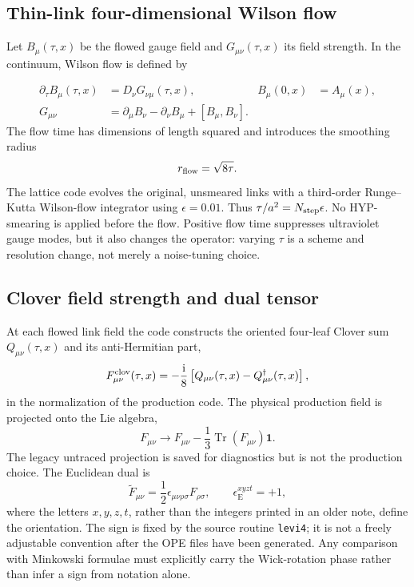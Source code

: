 \documentclass[11pt]{article}
\numberwithin{equation}{section}
\newcommand{\ii}{\mathrm{i}}
\DeclareMathOperator{\Tr}{Tr}
\begin{document}
\subsection{Thin-link four-dimensional Wilson flow}

Let \(B_\mu(\tau,x)\) be the flowed gauge field and
\(G_{\mu\nu}(\tau,x)\) its field strength.  In the continuum, Wilson flow is
defined by

\begin{align}
  \partial_\tau B_\mu(\tau,x)
  &=D_\nu G_{\nu\mu}(\tau,x),
  &B_\mu(0,x)&=A_\mu(x),
  \label{eq:gluon-wilson-flow-continuum}\\
  G_{\mu\nu}
  &=\partial_\mu B_\nu-\partial_\nu B_\mu+[B_\mu,B_\nu].
\end{align}
The flow time has dimensions of length squared and introduces the smoothing
radius
\begin{equation}
  r_{\rm flow}=\sqrt{8\tau}.
  \label{eq:gluon-flow-radius}
\end{equation}
The lattice code evolves the original, unsmeared links with a third-order
Runge--Kutta Wilson-flow integrator using
\(\epsilon=0.01\).  Thus \(\tau/a^2=N_{\rm step}\epsilon\).  No HYP-smearing
is applied before the flow.  Positive flow time suppresses ultraviolet gauge
modes, but it also changes the operator: varying \(\tau\) is a scheme and
resolution change, not merely a noise-tuning choice.

\subsection{Clover field strength and dual tensor}

At each flowed link field the code constructs the oriented four-leaf Clover
sum \(Q_{\mu\nu}(\tau,x)\) and its anti-Hermitian part,
\begin{equation}
  F^{\rm clov}_{\mu\nu}(\tau,x)
  =-\frac{\ii}{8}\left[Q_{\mu\nu}(\tau,x)
       -Q_{\mu\nu}^{\dagger}(\tau,x)\right],
  \label{eq:flowed-clover-strength}
\end{equation}
in the normalization of the production code.  The physical production field
is projected onto the Lie algebra,
\begin{equation}
  F_{\mu\nu}\longrightarrow
  F_{\mu\nu}-\frac{1}{3}\Tr(F_{\mu\nu})\mathbf 1.
  \label{eq:color-traceless}
\end{equation}
The legacy untraced projection is saved for diagnostics but is not the
production choice.  The Euclidean dual is
\begin{equation}
  \widetilde F_{\mu\nu}
  =\frac12\epsilon_{\mu\nu\rho\sigma}F_{\rho\sigma},
  \qquad \epsilon_{\mathrm E}^{xyzt}=+1,
  \label{eq:euclidean-dual-strength}
\end{equation}
where the letters \(x,y,z,t\), rather than the integers printed in an older
note, define the orientation.  The sign is fixed by the source routine
\texttt{levi4}; it is not a freely adjustable convention after the OPE files
have been generated.  Any comparison with Minkowski formulae must explicitly
carry the Wick-rotation phase rather than infer a sign from notation alone.
\end{document}
